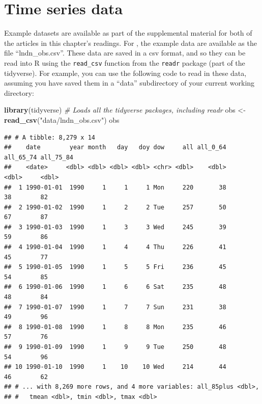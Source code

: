 \documentclass[
]{book}
\newenvironment{Shaded}{\begin{snugshade}}{\end{snugshade}}
\newcommand{\CommentTok}[1]{\textcolor[rgb]{0.56,0.35,0.01}{\textit{#1}}}
\newcommand{\KeywordTok}[1]{\textcolor[rgb]{0.13,0.29,0.53}{\textbf{#1}}}
\newcommand{\NormalTok}[1]{#1}
\newcommand{\StringTok}[1]{\textcolor[rgb]{0.31,0.60,0.02}{#1}}
\begin{document}
\hypertarget{time-series-data}{%
\section{Time series data}\label{time-series-data}}

Example datasets are available as part of the supplemental material for
both of the articles in this chapter's readings. For \citet{vicedo2019hands},
the example data are available as the file ``lndn\_obs.csv''. These data are
saved in a csv format, and so they can be read into R using the
\texttt{read\_csv} function from the \texttt{readr} package (part of the tidyverse).
For example, you can use the following code to read in these data,
assuming you have saved them in a ``data'' subdirectory of your current
working directory:

\begin{Shaded}
\begin{Highlighting}[]
\KeywordTok{library}\NormalTok{(tidyverse) }\CommentTok{# Loads all the tidyverse packages, including readr}
\NormalTok{obs <-}\StringTok{ }\KeywordTok{read_csv}\NormalTok{(}\StringTok{"data/lndn_obs.csv"}\NormalTok{)}
\NormalTok{obs}
\end{Highlighting}
\end{Shaded}

\begin{verbatim}
## # A tibble: 8,279 x 14
##    date        year month   day   doy dow     all all_0_64 all_65_74 all_75_84
##    <date>     <dbl> <dbl> <dbl> <dbl> <chr> <dbl>    <dbl>     <dbl>     <dbl>
##  1 1990-01-01  1990     1     1     1 Mon     220       38        38        82
##  2 1990-01-02  1990     1     2     2 Tue     257       50        67        87
##  3 1990-01-03  1990     1     3     3 Wed     245       39        59        86
##  4 1990-01-04  1990     1     4     4 Thu     226       41        45        77
##  5 1990-01-05  1990     1     5     5 Fri     236       45        54        85
##  6 1990-01-06  1990     1     6     6 Sat     235       48        48        84
##  7 1990-01-07  1990     1     7     7 Sun     231       38        49        96
##  8 1990-01-08  1990     1     8     8 Mon     235       46        57        76
##  9 1990-01-09  1990     1     9     9 Tue     250       48        54        96
## 10 1990-01-10  1990     1    10    10 Wed     214       44        46        62
## # ... with 8,269 more rows, and 4 more variables: all_85plus <dbl>,
## #   tmean <dbl>, tmin <dbl>, tmax <dbl>
\end{verbatim}
\end{document}
